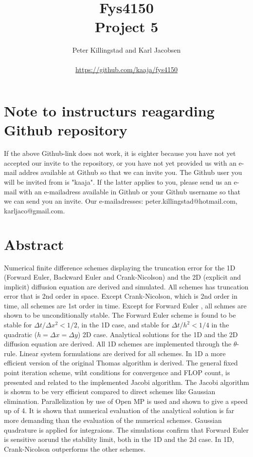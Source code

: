 \documentclass{article}
\title{Fys4150\\Project 5\\ }
\author{Peter Killingstad and Karl Jacobsen\\
\\
\url{https://github.com/kaaja/fys4150}}
\begin{document}
	
\maketitle

\section*{Note to instructurs reagarding Github repository}
If the above Github-link does not work, it is eighter because you have not yet accepted our invite to the repository, or you have not yet provided us with an e-mail addres available at Github so that we can invite you. The Github user you will be invited from is "kaaja". If the latter applies to you, please send us an e-mail with an e-mailadress available in Github or your Github username so that we can send you an invite. Our e-mailadresses: peter.killingstad@hotmail.com, karljaco@gmail.com.


\section*{Abstract}
Numerical finite difference schemes displaying the truncation error for the 1D (Forward Euler, Backward Euler and Crank-Nicolson) and the 2D (explicit and implicit) diffusion equation are derived and simulated. All schemes has truncation error that is 2nd order in space. Except Crank-Nicolson, which is 2nd order in time, all schemes are 1st order in time. Except for Forward Euler , all schmes are shown to be unconditionally stable. The Forward Euler scheme is found to be stable for $\Delta t/\Delta x^2 < 1/2$, in the 1D case, and stable for $\Delta t /h^2 < 1/4$ in the quadratic ($h = \Delta x = \Delta y$) 2D case. Analytical solutions for the 1D and the 2D diffusion equation are derived. All 1D schemes are implemented through the $\theta$-rule. Linear system formulations are derived for all schemes. In 1D a more efficient version of the original Thomas algorithm is derived. The general fixed point iteration scheme, wiht conditions for convergence and FLOP count, is presented and related to the implemented Jacobi algorithm. The Jacobi algorithm is showm to be very efficient compared to direct schemes like Gaussian elimination. Parallelization by use of Open MP is used and shown to give a speed up of 4. It is shown that numerical evaluation of the analytical solution is far more demanding than the evaluation of the numerical schemes. Gaussian quadrature is applied for integraions. The simulations confirm that Forward Euler is sensitive aorund the stability limit, both in the 1D and the 2d case. In 1D, Crank-Nicolson outperforms the other schemes.
\end{document}

